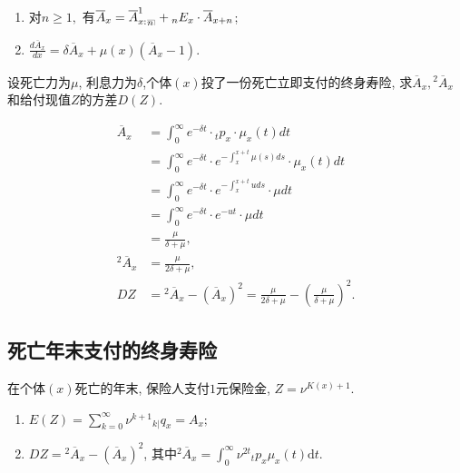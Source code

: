 \documentclass[lang=cn,10pt]{elegantbook}
\makeatletter
\DeclareRobustCommand{\annu}[1]{_{%
    \def\arraystretch{0}%
    \setlength\arraycolsep{1pt}%
    \setlength\arrayrulewidth{.2pt}%
    \begin{array}[b]{@{}c|}\hline
        \\[\arraycolsep]%
        \scriptstyle #1%
    \end{array}%
}}
\makeatother
\begin{document}
\begin{corollary}[精算现值的性质]
	\begin{enumerate}
		\item 对$n\ge1,$ 有$\overline{A}_x = \overline{A}_{x:}^1{}_{\annu{n}} + {}_nE_{x}\cdot \overline{A}_{x+n}$;
		\item $\frac{d\overline{A}_x}{dx} = \delta \overline{A}_x + \mu(x)(\overline{A}_x - 1).$
	\end{enumerate}
\end{corollary}

\begin{example}
    设死亡力为$\mu$, 利息力为$\delta$,个体$(x)$投了一份死亡立即支付的终身寿险, 求$\overline{A}_{x}, {}^2\overline{A}_{x} $和给付现值$Z$的方差$D(Z)$.
\end{example}
    \begin{solution}
    \begin{align*}
        \overline{A}_{x}     & =\int_0^{\infty}e^{-\delta t}\cdot {}_tp_x\cdot \mu_x(t)dt \\
        & =\int_0^{\infty}e^{-\delta t}\cdot e^{-\int_x^{x+t}\mu(s)ds}\cdot \mu_x(t)dt \\
        & =\int_0^{\infty}e^{-\delta t}\cdot e^{-\int_x^{x+t}uds}\cdot \mu dt    \\
        & =\int_0^{\infty}e^{-\delta t}\cdot e^{-ut}\cdot \mu dt \\
        & =\frac{\mu}{\delta +\mu}, \\
        {}^2\overline{A}_{x} 
		& =\frac{\mu}{2\delta +\mu}, \\
        DZ & ={}^2\overline{A}_{x}-(\overline{A}_{x})^2=\frac{\mu}{2\delta +\mu}-(\frac{\mu}{\delta +\mu})^2.
    \end{align*}
\end{solution}

\subsection{死亡年末支付的终身寿险}
\begin{definition}[支付现值]
	在个体$(x)$死亡的年末, 保险人支付$1$元保险金, $Z=\nu^{K(x)+1}$.
\end{definition}

\begin{proposition}[精算现值与方差]
	\begin{enumerate}
		\item $E(Z) = \sum_{k=0}^{\infty }{\nu^{k+1}{}_{k|}q_x} = A_x;$
		\item $DZ = {}^2\overline{A}_x - (\overline{A}_x)^2$, 其中${}^2\overline{A}_x = \int_0^\infty \nu^{2t}{}_tp_x\mu_x(t)\mathrm{d}t$.
	\end{enumerate}
\end{proposition}
\end{document}
